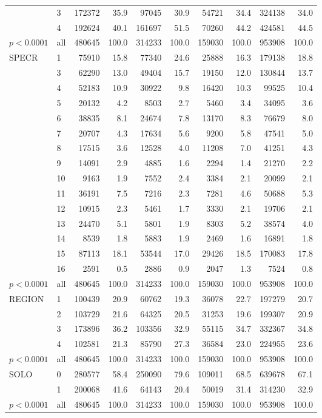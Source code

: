 \documentclass[11pt, oneside]{article}        %
\begin{document}
\begin{table}[ht]
{\begin{tabular}{ll|rr|rr|rr|rr}
   & 3 & 172372 & 35.9 & 97045 & 30.9 & 54721 & 34.4 & 324138 & 34.0 \\ 
   & 4 & 192624 & 40.1 & 161697 & 51.5 & 70260 & 44.2 & 424581 & 44.5 \\ 
   \hline
$p< 0.0001$ & all & 480645 & 100.0 & 314233 & 100.0 & 159030 & 100.0 & 953908 & 100.0 \\ 
   \hline
\hline
SPECR & 1 & 75910 & 15.8 & 77340 & 24.6 & 25888 & 16.3 & 179138 & 18.8 \\ 
   & 3 & 62290 & 13.0 & 49404 & 15.7 & 19150 & 12.0 & 130844 & 13.7 \\ 
   & 4 & 52183 & 10.9 & 30922 & 9.8 & 16420 & 10.3 & 99525 & 10.4 \\ 
   & 5 & 20132 & 4.2 & 8503 & 2.7 & 5460 & 3.4 & 34095 & 3.6 \\ 
   & 6 & 38835 & 8.1 & 24674 & 7.8 & 13170 & 8.3 & 76679 & 8.0 \\ 
   & 7 & 20707 & 4.3 & 17634 & 5.6 & 9200 & 5.8 & 47541 & 5.0 \\ 
   & 8 & 17515 & 3.6 & 12528 & 4.0 & 11208 & 7.0 & 41251 & 4.3 \\ 
   & 9 & 14091 & 2.9 & 4885 & 1.6 & 2294 & 1.4 & 21270 & 2.2 \\ 
   & 10 & 9163 & 1.9 & 7552 & 2.4 & 3384 & 2.1 & 20099 & 2.1 \\ 
   & 11 & 36191 & 7.5 & 7216 & 2.3 & 7281 & 4.6 & 50688 & 5.3 \\ 
   & 12 & 10915 & 2.3 & 5461 & 1.7 & 3330 & 2.1 & 19706 & 2.1 \\ 
   & 13 & 24470 & 5.1 & 5801 & 1.9 & 8303 & 5.2 & 38574 & 4.0 \\ 
   & 14 & 8539 & 1.8 & 5883 & 1.9 & 2469 & 1.6 & 16891 & 1.8 \\ 
   & 15 & 87113 & 18.1 & 53544 & 17.0 & 29426 & 18.5 & 170083 & 17.8 \\ 
   & 16 & 2591 & 0.5 & 2886 & 0.9 & 2047 & 1.3 & 7524 & 0.8 \\ 
   \hline
$p< 0.0001$ & all & 480645 & 100.0 & 314233 & 100.0 & 159030 & 100.0 & 953908 & 100.0 \\ 
   \hline
\hline
REGION & 1 & 100439 & 20.9 & 60762 & 19.3 & 36078 & 22.7 & 197279 & 20.7 \\ 
   & 2 & 103729 & 21.6 & 64325 & 20.5 & 31253 & 19.6 & 199307 & 20.9 \\ 
   & 3 & 173896 & 36.2 & 103356 & 32.9 & 55115 & 34.7 & 332367 & 34.8 \\ 
   & 4 & 102581 & 21.3 & 85790 & 27.3 & 36584 & 23.0 & 224955 & 23.6 \\ 
   \hline
$p< 0.0001$ & all & 480645 & 100.0 & 314233 & 100.0 & 159030 & 100.0 & 953908 & 100.0 \\ 
   \hline
\hline
SOLO & 0 & 280577 & 58.4 & 250090 & 79.6 & 109011 & 68.5 & 639678 & 67.1 \\ 
   & 1 & 200068 & 41.6 & 64143 & 20.4 & 50019 & 31.4 & 314230 & 32.9 \\ 
   \hline
$p< 0.0001$ & all & 480645 & 100.0 & 314233 & 100.0 & 159030 & 100.0 & 953908 & 100.0 \\ 
   \hline
\hline
\end{tabular}
}

\label{tab:descriptive.1}
\end{table}
\end{document}
